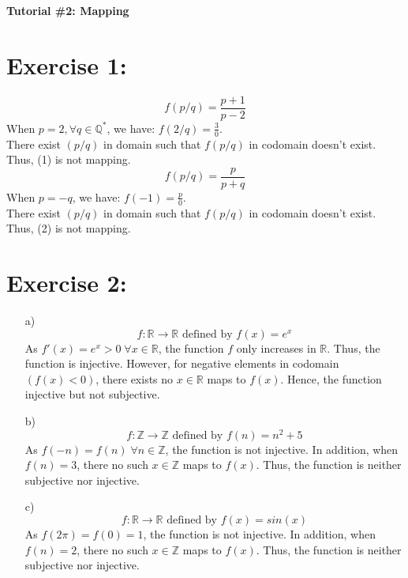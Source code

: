 \documentclass{article}
\newcommand{\Z}{\mathbb{Z}}
\newcommand{\Q}{\mathbb{Q}}
\newcommand{\R}{\mathbb{R}}
\begin{document}
    \centering
	\LARGE\textbf{Tutorial \#2: Mapping}
	
	\justifying
	\Large
    \section{Exercise 1:}
        \begin{equation}
            f(p/q) = \frac{p+1}{p-2}
        \end{equation}
        When $p = 2, \forall q \in \Q^*$, we have: $f(2/q) =  \frac{3}{0}$.\\
        There exist $(p/q)$ in domain such that $f(p/q)$ in codomain doesn't exist. Thus, (1) is not mapping. 
        \begin{equation}
            f(p/q) = \frac{p}{p+q}
        \end{equation}
        When $p = -q$, we have: $f(-1) =  \frac{p}{0}$.\\
        There exist $(p/q)$ in domain such that $f(p/q)$ in codomain doesn't exist. Thus, (2) is not mapping.
	\section{Exercise 2:}
		\begin{enumerate}
			\item[a)]
				\begin{equation*}
					f: \R \rightarrow \R \mbox{ defined by } f(x) = e^x
				\end{equation*}
				As $f'(x) = e^x > 0 \; \forall x \in \R$, the function $f$ only increases in $\R$. Thus, the function is injective.
				However, for negative elements in codomain $(f(x) < 0)$, there exists no $x \in \R$ maps to $f(x)$. Hence, the function injective but not subjective.
			\item[b)]
				\begin{equation*}
					f: \Z \rightarrow \Z \mbox{ defined by } f(n) = n^2 + 5
				\end{equation*}
				As $f(-n) = f(n) \; \forall n \in \Z$, the function is not injective. In addition, when $f(n) = 3$, there no such $x \in \Z$ maps to $f(x)$. Thus, the function is neither subjective nor injective.
			\item[c)]
				\begin{equation*}
					f: \R \rightarrow \R \mbox{ defined by } f(x) = sin(x)
				\end{equation*}
				As $f(2\pi) = f(0) = 1$, the function is not injective. In addition, when $f(n) = 2$, there no such $x \in \Z$ maps to $f(x)$. Thus, the function is neither subjective nor injective.
		\end{enumerate}
		
\end{document}
